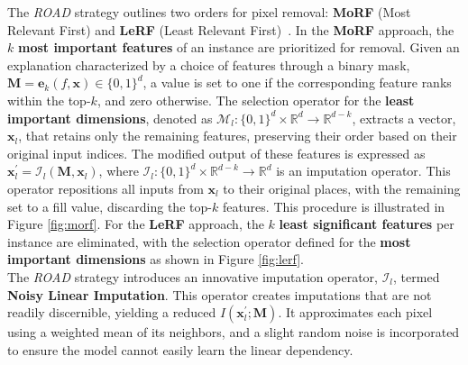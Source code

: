 The \textit{ROAD} strategy outlines two orders for pixel removal: \textbf{MoRF} (Most Relevant First) and \textbf{LeRF} (Least Relevant First)~\cite{DBLP:journals/corr/SamekBMBM15}. In the \textbf{MoRF} approach, the $k$ \textbf{most important features} of an instance are prioritized for removal. Given an explanation characterized by a choice of features through a binary mask, \(\boldsymbol{M} = \boldsymbol{e}_k(f, \boldsymbol{x}) \in\{0,1\}^d\), a value is set to one if the corresponding feature ranks within the top-$k$, and zero otherwise. The selection operator for the \textbf{least important dimensions}, denoted as \(\mathcal{M}_l:\{0,1\}^d \times \mathbb{R}^d \rightarrow \mathbb{R}^{d-k}\), extracts a vector, \(\boldsymbol{x}_l\), that retains only the remaining features, preserving their order based on their original input indices. The modified output of these features is expressed as \(\boldsymbol{x}_l^{\prime} = \mathcal{I}_l(\boldsymbol{M}, \boldsymbol{x}_l)\), where \(\mathcal{I}_l: \{0,1\}^d \times \mathbb{R}^{d-k} \rightarrow \mathbb{R}^d\) is an imputation operator. This operator repositions all inputs from \(\boldsymbol{x}_l\) to their original places, with the remaining set to a fill value, discarding the top-$k$ features. This procedure is illustrated in Figure \ref{fig:morf}. For the \textbf{LeRF} approach, the $k$ \textbf{least significant features} per instance are eliminated, with the selection operator defined for the \textbf{most important dimensions} as shown in Figure \ref{fig:lerf}.\\

The \textit{ROAD} strategy introduces an innovative imputation operator, \(\mathcal{I}_l\), termed \textbf{Noisy Linear Imputation}. This operator creates imputations that are not readily discernible, yielding a reduced \(I(\boldsymbol{x}_l^{\prime}; \boldsymbol{M})\). It approximates each pixel using a weighted mean of its neighbors, and a slight random noise is incorporated to ensure the model cannot easily learn the linear dependency.

